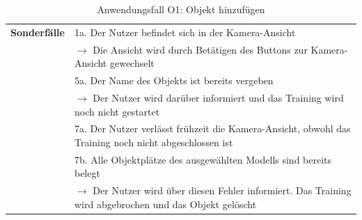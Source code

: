 \documentclass[oneside]{ausarbeitung}
\begin{document}
\begin{table}[htbp]
\begin{tabular}{|l|p{80mm}|}
		\textbf{Sonderfälle} & 1a. Der Nutzer befindet sich in der Kamera-Ansicht \\ & $\rightarrow$ Die Ansicht wird durch Betätigen des Buttons zur Kamera-Ansicht gewechselt \\
		& 5a. Der Name des Objekts ist bereits vergeben \\ & $\rightarrow$ Der Nutzer wird darüber informiert und das Training wird noch nicht gestartet \\ 
		& 7a. Der Nutzer verlässt frühzeit die Kamera-Ansicht, obwohl das Training noch nicht abgeschlossen ist \\ 
		& 7b. Alle Objektplätze des ausgewählten Modells sind bereits belegt \\ & $\rightarrow$ Der Nutzer wird über diesen Fehler informiert. Das Training wird abgebrochen und das Objekt gelöscht \\ \hline
		
	\end{tabular}
	\caption{Anwendungsfall O1: Objekt hinzufügen}
	\label{tab:use-case-add-object}
\end{table}
\end{document}
